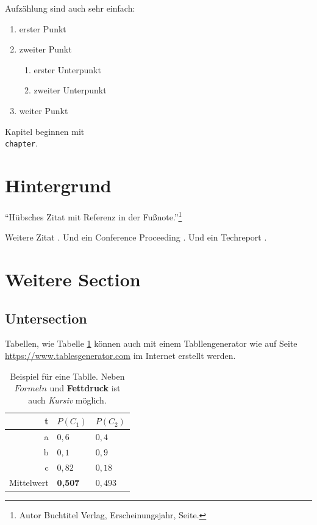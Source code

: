
Aufzählung sind auch sehr einfach:

\begin{enumerate}
    \item erster Punkt
    \item zweiter Punkt
    \begin{enumerate}
        \item erster Unterpunkt
        \item zweiter Unterpunkt
    \end{enumerate}
    \item weiter Punkt
\end{enumerate}

\blindtext



Kapitel beginnen mit \texttt{\\chapter}.

\section{Hintergrund} %
\label{sec:hintergrund}

\begin{center}
    ``Hübsches Zitat mit Referenz in der Fußnote.''\footnote{Autor Buchtitel Verlag, Erscheinungsjahr, Seite.}
\end{center}

Weitere Zitat \cite{weise2014benchmarking}. Und ein Conference Proceeding \cite{Hess2017}. Und ein Techreport \cite{instance1290}.

\section{Weitere Section} %
\label{sec:weitere_arbeiten}

\subsection{Untersection}
\label{ssec:untersection}

\blindtext


Tabellen, wie Tabelle \ref{tab:example} können auch mit einem Tabllengenerator wie auf Seite \url{https://www.tablesgenerator.com} im Internet erstellt werden.
\begin{table}[h]
    \centering
    \begin{tabular}{|r||l|l|}\hline
        t & $P(C_1)$ & $P(C_2)$\\\hline
        a & $0,6$ & $0,4$\\\hline
        b & $0,1$ & $0,9$\\\hline
        c & $0,82$ & $0,18$\\\hline\hline
        Mittelwert & \textbf{0,507} & $0,493$\\\hline
    \end{tabular}
    \caption{Beispiel für eine Tablle. Neben $Formeln$ und \textbf{Fettdruck} ist auch \textit{Kursiv} möglich.}
    \label{tab:example}
\end{table} 


